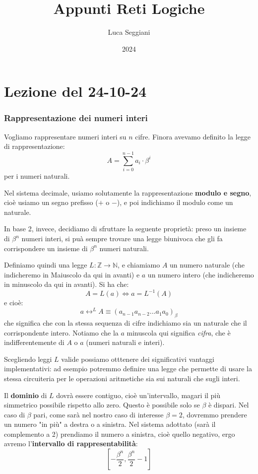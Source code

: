 \documentclass[a4paper,11pt]{article}
\title{Appunti Reti Logiche}
\author{Luca Seggiani}
\date{2024}
\begin{document}
\section{Lezione del 24-10-24}

\thispagestyle{empty}
\pagestyle{fancy}

\subsubsection{Rappresentazione dei numeri interi}
Vogliamo rappresentare numeri interi su $n$ cifre.
Finora avevamo definito la legge di rappresentazione:
$$
A = \sum_{i=0}^{n-1} a_i \cdot \beta^i
$$
per i numeri naturali.

Nel sistema decimale, usiamo solutamente la rappresentazione \textbf{modulo e segno}, cioè usiamo un segno prefisso ($+$ o $-$), e poi indichiamo il modulo come un naturale.

In base 2, invece, decidiamo di sfruttare la seguente proprietà: preso un insieme di $\beta^n$ numeri interi, si puà sempre trovare una legge biunivoca che gli fa corrispondere un insieme di $\beta^n$ numeri naturali.

Definiamo quindi una legge $L: \mathbb{Z} \rightarrow \mathbb{N}$, e chiamiamo $A$ un numero naturale (che indicheremo in Maiuscolo da qui in avanti) e $a$ un numero intero (che indicheremo in minuscolo da qui in avanti).
Si ha che:
$$
A = L(a) \Leftrightarrow a = L^{-1}(A)
$$
e cioè:
$$ 
a \leftrightarrow^L A \equiv (a_{n-1}a_{n-2}...a_1a_0)_\beta
$$
che significa che con la stessa sequenza di cifre indichiamo sia un naturale che il corrispondente intero.
Notiamo che la $a$ minuscola qui significa \textit{cifra}, che è indifferentemente di $A$ o $a$ (numeri naturali e interi).

Scegliendo leggi $L$ valide possiamo otttenere dei significativi vantaggi implementativi: ad esempio potremmo definire una legge che permette di usare la stessa circuiteria per le operazioni aritmetiche sia sui naturali che sugli interi.

Il \textbf{dominio} di $L$ dovrà essere contiguo, cioè un'intervallo, magari il più simmetrico possibile rispetto allo zero.
Questo è possibile solo se $\beta$ è dispari.
Nel caso di $\beta$ pari, come sarà nel nostro caso di interesse $\beta = 2$, dovremmo prendere un numero "in più" a destra o a sinistra.
Nel sistema adottato (sarà il complemento a 2) prendiamo il numero a sinistra, cioè quello negativo, ergo avremo l'\textbf{intervallo di rappresentabilità}:
$$
\left[ -\frac{\beta^n}{2}, \frac{\beta^n}{2} - 1 \right]
$$
\end{document}
